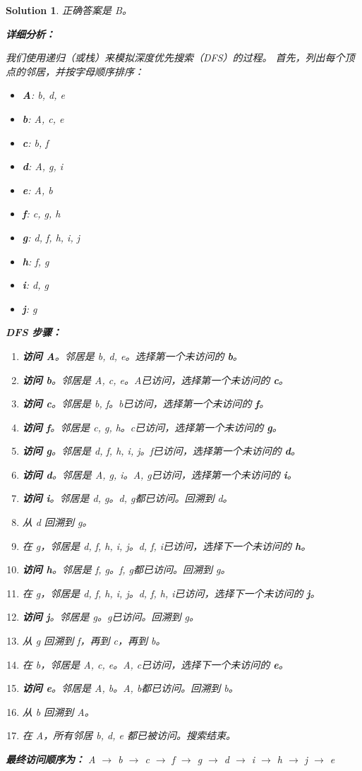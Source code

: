 \documentclass[UTF8]{report}
\newtheorem{solution}{Solution}
\theoremstyle{MyLineTheoremStyle} %
\theoremstyle{MyBlockTheoremStyle} %
\theoremstyle{MySubsubsectionStyle} %
\begin{document}
\begin{solution}
正确答案是 B。

\textbf{详细分析：}

我们使用递归（或栈）来模拟深度优先搜索（DFS）的过程。
首先，列出每个顶点的邻居，并按字母顺序排序：
\begin{itemize}
    \item \textbf{A}: b, d, e
    \item \textbf{b}: A, c, e
    \item \textbf{c}: b, f
    \item \textbf{d}: A, g, i
    \item \textbf{e}: A, b
    \item \textbf{f}: c, g, h
    \item \textbf{g}: d, f, h, i, j
    \item \textbf{h}: f, g
    \item \textbf{i}: d, g
    \item \textbf{j}: g
\end{itemize}

\textbf{DFS 步骤：}
\begin{enumerate}
    \item \textbf{访问 A}。邻居是 b, d, e。选择第一个未访问的 \textbf{b}。
    \item \textbf{访问 b}。邻居是 A, c, e。A已访问，选择第一个未访问的 \textbf{c}。
    \item \textbf{访问 c}。邻居是 b, f。b已访问，选择第一个未访问的 \textbf{f}。
    \item \textbf{访问 f}。邻居是 c, g, h。c已访问，选择第一个未访问的 \textbf{g}。
    \item \textbf{访问 g}。邻居是 d, f, h, i, j。f已访问，选择第一个未访问的 \textbf{d}。
    \item \textbf{访问 d}。邻居是 A, g, i。A, g已访问，选择第一个未访问的 \textbf{i}。
    \item \textbf{访问 i}。邻居是 d, g。d, g都已访问。回溯到 d。
    \item 从 d 回溯到 g。
    \item 在 g，邻居是 d, f, h, i, j。d, f, i已访问，选择下一个未访问的 \textbf{h}。
    \item \textbf{访问 h}。邻居是 f, g。f, g都已访问。回溯到 g。
    \item 在 g，邻居是 d, f, h, i, j。d, f, h, i已访问，选择下一个未访问的 \textbf{j}。
    \item \textbf{访问 j}。邻居是 g。g已访问。回溯到 g。
    \item 从 g 回溯到 f，再到 c，再到 b。
    \item 在 b，邻居是 A, c, e。A, c已访问，选择下一个未访问的 \textbf{e}。
    \item \textbf{访问 e}。邻居是 A, b。A, b都已访问。回溯到 b。
    \item 从 b 回溯到 A。
    \item 在 A，所有邻居 b, d, e 都已被访问。搜索结束。
\end{enumerate}

\textbf{最终访问顺序为：}
A $\rightarrow$ b $\rightarrow$ c $\rightarrow$ f $\rightarrow$ g $\rightarrow$ d $\rightarrow$ i $\rightarrow$ h $\rightarrow$ j $\rightarrow$ e
\end{solution}
\end{document}
